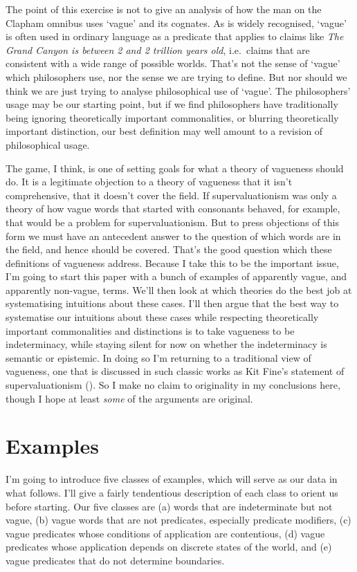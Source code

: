\documentclass[
  10pt,
  letterpaper,
  DIV=11,
  numbers=noendperiod,
  twoside]{scrartcl}
\begin{document}
The point of this exercise is not to give an analysis of how the man on
the Clapham omnibus uses `vague' and its cognates. As is widely
recognised, `vague' is often used in ordinary language as a predicate
that applies to claims like \emph{The Grand Canyon is between 2 and 2
trillion years old}, i.e.~claims that are consistent with a wide range
of possible worlds. That's not the sense of `vague' which philosophers
use, nor the sense we are trying to define. But nor should we think we
are just trying to analyse philosophical use of `vague'. The
philosophers' usage may be our starting point, but if we find
philosophers have traditionally being ignoring theoretically important
commonalities, or blurring theoretically important distinction, our best
definition may well amount to a revision of philosophical usage.

The game, I think, is one of setting goals for what a theory of
vagueness should do. It is a legitimate objection to a theory of
vagueness that it isn't comprehensive, that it doesn't cover the field.
If supervaluationism was only a theory of how vague words that started
with consonants behaved, for example, that would be a problem for
supervaluationism. But to press objections of this form we must have an
antecedent answer to the question of which words are in the field, and
hence should be covered. That's the good question which these
definitions of vagueness address. Because I take this to be the
important issue, I'm going to start this paper with a bunch of examples
of apparently vague, and apparently non-vague, terms. We'll then look at
which theories do the best job at systematising intuitions about these
cases. I'll then argue that the best way to systematise our intuitions
about these cases while respecting theoretically important commonalities
and distinctions is to take vagueness to be indeterminacy, while staying
silent for now on whether the indeterminacy is semantic or epistemic. In
doing so I'm returning to a traditional view of vagueness, one that is
discussed in such classic works as Kit Fine's statement of
supervaluationism (). So I make no
claim to originality in my conclusions here, though I hope at least
\emph{some} of the arguments are original.

\section{Examples}\label{examples}

I'm going to introduce five classes of examples, which will serve as our
data in what follows. I'll give a fairly tendentious description of each
class to orient us before starting. Our five classes are (a) words that
are indeterminate but not vague, (b) vague words that are not
predicates, especially predicate modifiers, (c) vague predicates whose
conditions of application are contentious, (d) vague predicates whose
application depends on discrete states of the world, and (e) vague
predicates that do not determine boundaries.
\end{document}
